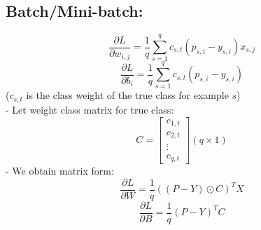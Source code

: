 \documentclass{article}
\begin{document}
    \subsection*{Batch/Mini-batch:}
    \[
        \frac{\partial L}{\partial w_{i, j}} = 
        \frac{1}{q}\sum_{s = 1}^{q}c_{s, t}(p_{s, i} - y_{s, i})x_{s, j}
    \] 
    \[
        \frac{\partial L}{\partial b_i} = 
        \frac{1}{q}\sum_{s = 1}^{q}c_{s, t}(p_{s, i} - y_{s, i})
    \] 
    ($c_{s,t}$ is the class weight of the true class for example $s$) \\
    - Let weight class matrix for true class:
    \[
        C = 
        \begin{bmatrix}
            c_{1, t} \\
            c_{2, t} \\
            \vdots \\
            c_{q, t}    
        \end{bmatrix} (q \times 1)
    \]
    - We obtain matrix form:
    \[
        \frac{\partial L}{\partial W} = \frac{1}{q}\left((P - Y) \odot C\right)^TX
    \]
    \[
        \frac{\partial L}{\partial B} = \frac{1}{q}(P - Y)^TC
    \]
\end{document}
